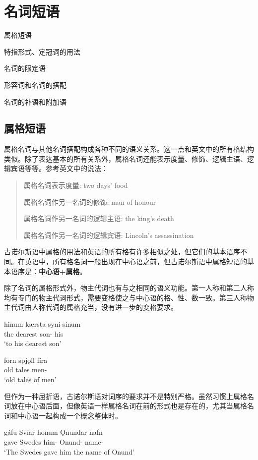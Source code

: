 \chapter{名词短语}
\begin{introduction}[章节要点]
    \item 属格短语
    \item 特指形式、定冠词的用法
    \item 名词的限定语
    \item 形容词和名词的搭配
    \item 名词的补语和附加语
\end{introduction}

\section{属格短语}
属格名词与其他名词搭配构成各种不同的语义关系。这一点和英文中的所有格结构类似。除了表达基本的所有关系外，属格名词还能表示度量、修饰、逻辑主语、逻辑宾语等等。参考英文中的说法：
\begin{quote}
    属格名词表示度量: two days' food

    属格名词作另一名词的修饰: man of honour

    属格名词作另一名词的逻辑主语: the king's death

    属格名词作另一名词的逻辑宾语: Lincoln's assassination
\end{quote}

古诺尔斯语中属格的用法和英语的所有格有许多相似之处，但它们的基本语序不同。在英语中，所有格名词一般出现在中心语之前，但古诺尔斯语中属格短语的基本语序是：\textbf{中心语+属格}。

除了名词的属格形式外，物主代词也有与之相同的语义功能。第一人称和第二人称均有专门的物主代词形式，需要变格使之与中心语的格、性、数一致。第三人称物主代词由人称代词的属格充当，没有进一步的变格要求。
\begin{exe}
    \ex \gll
    hinum kærsta syni sínum\\
    the dearest son-{\dat} his\\
    \trans `to his dearest son'

    \ex \gll
    forn spjǫll fíra\\
    old tales men-{\gen}\\
    \trans `old tales of men'
\end{exe}

但作为一种屈折语，古诺尔斯语对词序的要求并不是特别严格。虽然习惯上属格名词放在中心语后面，但像英语一样属格名词在前的形式也是存在的，尤其当属格名词和中心语一起构成一个概念整体时。
\begin{exe}
    \ex \gll
    gáfu Svíar honum \k{O}nundar nafn\\
    gave Swedes him-{\dat} Onund-{\gen} name-{\acc}\\
    \trans `The Swedes gave him the name of Onund'
\end{exe}

